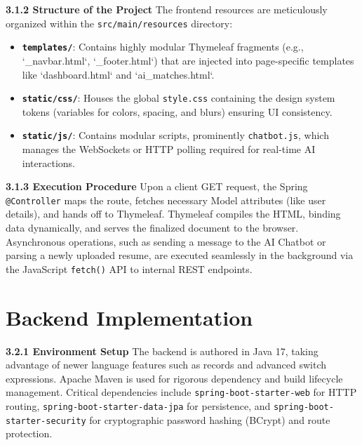\documentclass[12pt]{report}
\begin{document}
\textbf{3.1.2 Structure of the Project}
The frontend resources are meticulously organized within the \texttt{src/main/resources} directory:
\begin{itemize}
    \item \textbf{\texttt{templates/}}: Contains highly modular Thymeleaf fragments (e.g., `\_navbar.html`, `\_footer.html`) that are injected into page-specific templates like `dashboard.html` and `ai\_matches.html`.
    \item \textbf{\texttt{static/css/}}: Houses the global \texttt{style.css} containing the design system tokens (variables for colors, spacing, and blurs) ensuring UI consistency.
    \item \textbf{\texttt{static/js/}}: Contains modular scripts, prominently \texttt{chatbot.js}, which manages the WebSockets or HTTP polling required for real-time AI interactions.
\end{itemize}

\textbf{3.1.3 Execution Procedure}
Upon a client GET request, the Spring \texttt{@Controller} maps the route, fetches necessary Model attributes (like user details), and hands off to Thymeleaf. Thymeleaf compiles the HTML, binding data dynamically, and serves the finalized document to the browser. Asynchronous operations, such as sending a message to the AI Chatbot or parsing a newly uploaded resume, are executed seamlessly in the background via the JavaScript \texttt{fetch()} API to internal REST endpoints.

\section{Backend Implementation} 

\textbf{3.2.1 Environment Setup}
The backend is authored in Java 17, taking advantage of newer language features such as records and advanced switch expressions. Apache Maven is used for rigorous dependency and build lifecycle management. Critical dependencies include \texttt{spring-boot-starter-web} for HTTP routing, \texttt{spring-boot-starter-data-jpa} for persistence, and \texttt{spring-boot-starter-security} for cryptographic password hashing (BCrypt) and route protection.
\end{document}
